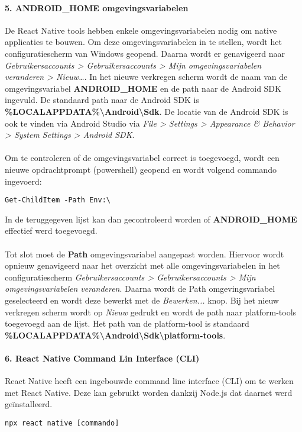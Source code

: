 \paragraph{5. ANDROID\_HOME omgevingsvariabelen}
De React Native tools hebben enkele omgevingsvariabelen nodig om native applicaties te bouwen. 
Om deze omgevingsvariabelen in te stellen, wordt het configuratiescherm van Windows geopend. 
Daarna wordt er genavigeerd naar
\textit{Gebruikersaccounts > Gebruikersaccounts > Mijn omgevingsvariabelen veranderen > Nieuw\dots}. 
In het nieuwe verkregen scherm wordt de naam van de omgevingsvariabel \textbf{ANDROID\_HOME} 
en de path naar de Android SDK ingevuld. De standaard path naar de Android SDK is 
\textbf{\%LOCALAPPDATA\%\backslash Android\backslash Sdk}. 
De locatie van de Android SDK is ook te vinden via Android Studio via 
\textit{File > Settings > Appearance \& Behavior > System Settings > Android SDK}.
\\\\
Om te controleren of de omgevingsvariabel correct is toegevoegd, wordt een nieuwe 
opdrachtprompt (powershell) geopend en wordt volgend commando ingevoerd:
\begin{verbatim}
Get-ChildItem -Path Env:\
\end{verbatim}
In de teruggegeven lijst kan dan gecontroleerd worden of \textbf{ANDROID\_HOME} effectief werd toegevoegd.
\\\\
Tot slot moet de \textbf{Path} omgevingsvariabel aangepast worden. 
Hiervoor wordt opnieuw genavigeerd naar het overzicht met alle omgevingsvariabelen in het configuratiescherm 
\textit{Gebruikersaccounts > Gebruikersaccounts > Mijn omgevingsvariabelen veranderen}. 
Daarna wordt de Path omgevingsvariabel geselecteerd en wordt deze bewerkt met de \textit{Bewerken...} knop. 
Bij het nieuw verkregen scherm wordt op \textit{Nieuw} gedrukt en wordt de path naar platform-tools 
toegevoegd aan de lijst. Het path van de platform-tool is standaard 
\textbf{\%LOCALAPPDATA\%\backslash Android\backslash Sdk\backslash platform-tools}.

\paragraph{6. React Native Command Lin Interface (CLI)}
React Native heeft een ingebouwde command line interface (CLI) om te werken met React Native. 
Deze kan gebruikt worden dankzij Node.js dat daarnet werd geïnstalleerd.
\begin{verbatim}
npx react native [commando]
\end{verbatim}

